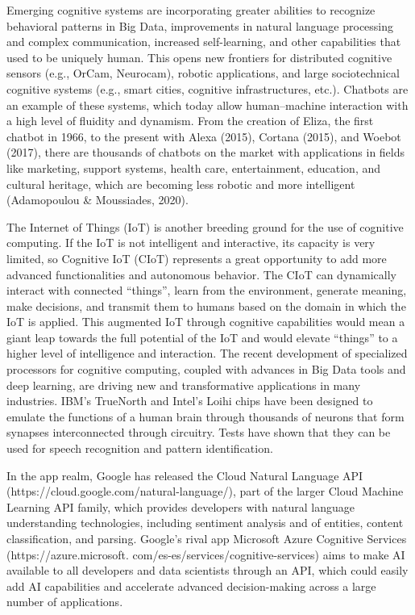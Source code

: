 \documentclass[
  letterpaper,
  DIV=11,
  numbers=noendperiod]{scrreprt}
\begin{document}
Emerging cognitive systems are incorporating greater abilities to
recognize behavioral patterns in Big Data, improvements in natural
language processing and complex communication, increased self-learning,
and other capabilities that used to be uniquely human. This opens new
frontiers for distributed cognitive sensors (e.g., OrCam, Neurocam),
robotic applications, and large sociotechnical cognitive systems (e.g.,
smart cities, cognitive infrastructures, etc.). Chatbots are an example
of these systems, which today allow human--machine interaction with a
high level of fluidity and dynamism. From the creation of Eliza, the
first chatbot in 1966, to the present with Alexa (2015), Cortana (2015),
and Woebot (2017), there are thousands of chatbots on the market with
applications in fields like marketing, support systems, health care,
entertainment, education, and cultural heritage, which are becoming less
robotic and more intelligent (Adamopoulou \& Moussiades, 2020).

The Internet of Things (IoT) is another breeding ground for the use of
cognitive computing. If the IoT is not intelligent and interactive, its
capacity is very limited, so Cognitive IoT (CIoT) represents a great
opportunity to add more advanced functionalities and autonomous
behavior. The CIoT can dynamically interact with connected ``things'',
learn from the environment, generate meaning, make decisions, and
transmit them to humans based on the domain in which the IoT is applied.
This augmented IoT through cognitive capabilities would mean a giant
leap towards the full potential of the IoT and would elevate ``things''
to a higher level of intelligence and interaction. The recent
development of specialized processors for cognitive computing, coupled
with advances in Big Data tools and deep learning, are driving new and
transformative applications in many industries. IBM's TrueNorth and
Intel's Loihi chips have been designed to emulate the functions of a
human brain through thousands of neurons that form synapses
interconnected through circuitry. Tests have shown that they can be used
for speech recognition and pattern identification.

In the app realm, Google has released the Cloud Natural Language API
(https://cloud.google.com/natural-language/), part of the larger Cloud
Machine Learning API family, which provides developers with natural
language understanding technologies, including sentiment analysis and of
entities, content classification, and parsing. Google's rival app
Microsoft Azure Cognitive Services (https://azure.microsoft.
com/es-es/services/cognitive-services) aims to make AI available to all
developers and data scientists through an API, which could easily add AI
capabilities and accelerate advanced decision-making across a large
number of applications.
\end{document}
